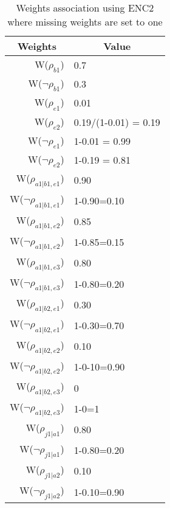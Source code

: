 \begin{table}[htb]
\centering
\caption{Weights association using ENC2 where missing weights are set to one}
\label{weightsEnc2}
\begin{tabular}{rl}
\hline
\multicolumn{1}{c}{Weights} & \multicolumn{1}{c}{Value} \\ \hline
W(\(\rho_{b1}\)) & 0.7 \\
W(\(\neg\rho_{b1}\)) & 0.3 \\
W(\(\rho_{e1}\)) & 0.01 \\
W(\(\rho_{e2}\)) & 0.19/(1-0.01) = 0.19 \\
W(\(\neg\rho_{e1}\)) & 1-0.01 = 0.99 \\
W(\(\neg\rho_{e2}\)) & 1-0.19 = 0.81 \\
W(\(\rho_{a1|b1,e1}\)) & 0.90 \\
W(\(\neg\rho_{a1|b1,e1}\)) & 1-0.90=0.10 \\
W(\(\rho_{a1|b1,e2}\)) & 0.85 \\
\multicolumn{1}{l}{W(\(\neg\rho_{a1|b1,e2}\))} & 1-0.85=0.15 \\
W(\(\rho_{a1|b1,e3}\)) & 0.80 \\
W(\(\neg\rho_{a1|b1,e3}\)) & 1-0.80=0.20 \\
W(\(\rho_{a1|b2,e1}\)) & 0.30 \\
W(\(\neg\rho_{a1|b2,e1}\)) & 1-0.30=0.70 \\
W(\(\rho_{a1|b2,e2}\)) & 0.10 \\
W(\(\neg\rho_{a1|b2,e2}\)) & 1-0-10=0.90 \\
W(\(\rho_{a1|b2,e3}\)) & 0 \\
W(\(\neg\rho_{a1|b2,e3}\)) & 1-0=1 \\
W(\(\rho_{j1|a1}\)) & 0.80 \\
W(\(\neg\rho_{j1|a1}\)) & 1-0.80=0.20 \\
W(\(\rho_{j1|a2}\)) & 0.10 \\
W(\(\neg\rho_{j1|a2}\)) & 1-0.10=0.90
\end{tabular}
\end{table}